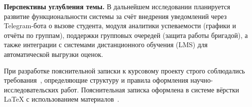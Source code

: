 \textbf{Перспективы углубления темы.} В дальнейшем исследовании планируется 
развитие функциональности системы за счёт внедрения уведомлений через 
Telegram-бота о вызове студента, модуля аналитики успеваемости (графики и 
отчёты по группам), поддержки групповых очередей (защита работы бригадой), 
а также интеграции с системами дистанционного обучения (LMS) для автоматической 
выгрузки оценок.

При разработке пояснительной записки к курсовому проекту строго соблюдались
требования~\cite{gost_report}, определяющие структуру и правила оформления
научно-исследовательских работ. Пояснительная записка оформлена в системе вёрстки
\LaTeX{} с использованием материалов~\cite{learnlatex, mospolytech_course, latex3days}.